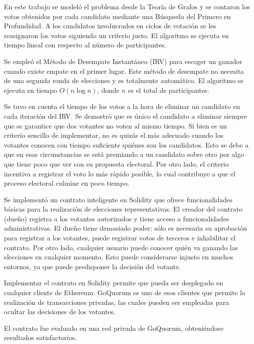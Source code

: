 \begin{conclusions}

    En este trabajo se model\'o el problema desde la Teor\'ia de Grafos y  se contaron los votos obtenidos por cada candidato mediante una B\'usqueda del Primero en Profundidad. A los candidatos involucrados en ciclos de votaci\'on se les reasignaron los votos siguiendo un criterio justo. El algoritmo se ejecuta en tiempo lineal con respecto al n\'umero de participantes.

    Se emple\'o el M\'etodo de Desempate Instant\'aneo (IRV) para escoger un ganador cuando existe empate en el primer lugar. Este m\'etodo de desempate no necesita de una segunda ronda de elecciones y es totalmente autom\'atico. El algoritmo se ejecuta en tiempo $O(n \log n)$, donde $n$ es el total de participantes.
    
    Se tuvo en cuenta el tiempo de los votos a la hora de eliminar un candidato  en cada iteraci\'on del IRV. Se demostr\'o que es \'unico el candidato a eliminar siempre que se garantice que dos votantes no voten al mismo tiempo. Si bien es un criterio sencillo de implementar, no es quiz\'as el m\'as adecuado cuando los votantes conocen con tiempo suficiente qui\'enes son los candidatos. Esto se debe a que en esas circunstancias se est\'a premiando a un candidato sobre otro por algo que tiene poco que ver con su propuesta electoral. Por otro lado, el criterio incentiva a registrar el voto lo m\'as r\'apido posible, lo cual contribuye a que  el proceso electoral culmine en poco tiempo.

    Se implement\'o un contrato inteligente en  Solidity que ofrece funcionalidades b\'asicas para la realizaci\'on de elecciones representativas. El creador del contrato (due\~no) registra a los votantes autorizados y tiene acceso a funcionalidades administrativas. El due\~no tiene demasiado poder: s\'olo es necesaria su aprobaci\'on para registrar a los votantes, puede registrar votos de terceros e inhabilitar el contrato. Por otro lado, cualquier usuario puede conocer qui\'en va ganando las elecciones en cualquier momento. Esto puede considerarse injusto en muchos entornos, ya que puede predisponer la decisi\'on del votante.

    Implementar el contrato en Solidity permite que pueda ser desplegado en cualquier cliente de Ethereum. GoQuorum es uno de esos clientes que permite la realizaci\'on de transacciones privadas, las cuales pueden ser empleadas para ocultar las decisiones de los votantes. 
    
    El contrato fue evaluado en una red privada de GoQuorum, obteni\'endose resultados satisfactorios.
\end{conclusions}
